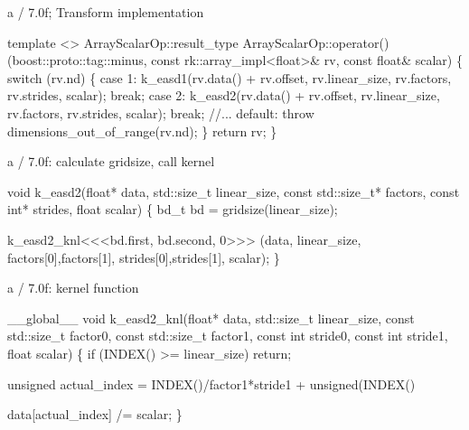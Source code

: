 
\begin{frame}[fragile]{a / 7.0f; Transform implementation}
\begin{semiverbatim}template <>
ArrayScalarOp::result_type
ArrayScalarOp::operator()(boost::proto::tag::minus, 
                          const rk::array_impl<float>& rv, 
                          const float& scalar)
\{
  switch (rv.nd) \{
    case 1:  k_easd1(rv.data() + rv.offset, rv.linear_size, 
                    rv.factors, rv.strides, 
                    scalar); break;
    case 2:  k_easd2(rv.data() + rv.offset, rv.linear_size, 
                    rv.factors, rv.strides, 
                    scalar); break;
    //...
        default:
    throw dimensions_out_of_range(rv.nd);
  \}
  return rv;
\}
\end{semiverbatim}
\end{frame}

\begin{frame}[fragile]{a / 7.0f: calculate gridsize, call kernel}
\begin{semiverbatim}
void k_easd2(float* data, 
             std::size_t linear_size,
             const std::size_t* factors, 
             const int* strides,
             float scalar)
\{
  bd_t bd = gridsize(linear_size);

  k_easd2_knl<\hskip0pt<\hskip0pt<bd.first, bd.second, 0>\hskip0pt>\hskip0pt>
    (data,
     linear_size,
     factors[0],factors[1],
     strides[0],strides[1],
     scalar);
\}
\end{semiverbatim}
\end{frame}


\begin{frame}[fragile]{a / 7.0f: kernel function}
\begin{semiverbatim}__global__ void
k_easd2_knl(float* data,
            std::size_t linear_size,
            const std::size_t factor0, const std::size_t factor1,
            const int stride0, const int stride1,
            float scalar)
\{
  if (INDEX() >= linear_size)
    return;

  unsigned actual_index = 
    INDEX()/factor1*stride1 
    +  unsigned(INDEX() %

  data[actual_index] /= scalar;
\}
\end{semiverbatim}
\end{frame}

